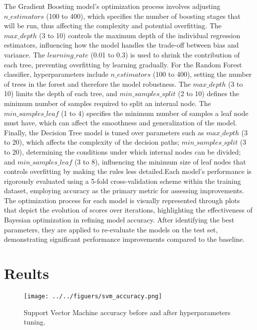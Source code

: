 \documentclass[
	letterpaper, %
	12pt, %
	unnumberedsections, %
	twoside, %
]{LTJournalArticle}
\begin{document}
The Gradient Boosting model's optimization process involves adjusting $n\_estimators$ (100 to 400), which specifies the number of boosting stages that will be run, thus affecting the complexity and potential overfitting. The $max\_depth$ (3 to 10) controls the maximum depth of the individual regression estimators, influencing how the model handles the trade-off between bias and variance. The $learning\_rate$ (0.01 to 0.3) is used to shrink the contribution of each tree, preventing overfitting by learning gradually.
For the Random Forest classifier, hyperparameters include $n\_estimators$ (100 to 400), setting the number of trees in the forest and therefore the model robustness. The $max\_depth$ (3 to 10) limits the depth of each tree, and $min\_samples\_split$ (2 to 10) defines the minimum number of samples required to split an internal node. The $min\_samples\_leaf$ (1 to 4) specifies the minimum number of samples a leaf node must have, which can affect the smoothness and generalization of the model.
Finally, the Decision Tree model is tuned over parameters such as $max\_depth$ (3 to 20), which affects the complexity of the decision paths; $min\_samples\_split$ (3 to 20), determining the conditions under which internal nodes can be divided; and $min\_samples\_leaf$ (3 to 8), influencing the minimum size of leaf nodes that controls overfitting by making the rules less detailed.Each model's performance is rigorously evaluated using a 5-fold cross-validation scheme within the training dataset, employing accuracy as the primary metric for assessing improvements. The optimization process for each model is visually represented through plots that depict the evolution of scores over iterations, highlighting the effectiveness of Bayesian optimization in refining model accuracy. After identifying the best parameters, they are applied to re-evaluate the models on the test set, demonstrating significant performance improvements compared to the baseline.
\section{Reults}

\begin{figure}
	\texttt{[image: ../../figuers/svm\_accuracy.png]}
	\caption{Support Vector Machine accuracy before and after hyperparameters tuning.}
	\label{fig:svm_accuracy}
\end{figure}
\end{document}
